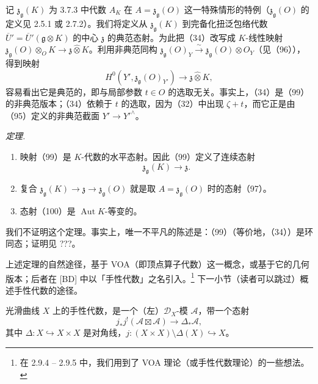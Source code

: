 记 $\mathfrak{z}_{\mathfrak{g}}(K)$ 为 3.7.3 中代数 $A_{K}$ 在 $A = \mathfrak{z}_{\mathfrak{g}}(O)$ 这一特殊情形的特例（$\mathfrak{z}_{\mathfrak{g}}(O)$ 的定义见 2.5.1 或 2.7.2）。我们将定义从 $\mathfrak{z}_{\mathfrak{g}}(K)$ 到完备化扭泛包络代数 $\overline{U}' = \overline{U}'(\mathfrak{g}\otimes K)$ 的中心 $\mathfrak{z}$ 的典范态射。为此把（34）改写成 $K$-线性映射 $\mathfrak{z}_{\mathfrak{g}}(O)\otimes_{O}K \to \mathfrak{z}\widehat{\otimes}K$。利用非典范同构 $\mathfrak{z}_{\mathfrak{g}}(O)_{Y} \xrightarrow{\sim} \mathfrak{z}_{\mathfrak{g}}(O)\otimes O_{Y}$（见（96）），得到映射
\begin{equation}\tag{99}
H^{0}(Y', \mathfrak{z}_{\mathfrak{g}}(O)_{Y'}) \to \mathfrak{z}\widehat{\otimes}K,
\end{equation}
容易看出它是典范的，即与局部参数 $t \in O$ 的选取无关。事实上，（34）是（99）的非典范版本；（34）依赖于 $t$ 的选取，因为（32）中出现 $\zeta + t$，而它正是由（95）定义的非典范截面 $Y' \to Y'^{\wedge}$。

 \emph{定理.}
\begin{enumerate}[label=(\roman*),leftmargin=2.2em]
  \item 映射（99）是 $K$-代数的水平态射。因此（99）定义了连续态射
  \begin{equation}\tag{100}
  \mathfrak{z}_{\mathfrak{g}}(K) \to \mathfrak{z}.
  \end{equation}
  \item 复合 $\mathfrak{z}_{\mathfrak{g}}(K) \to \mathfrak{z} \to \mathfrak{z}_{\mathfrak{g}}(O)$ 就是取 $A = \mathfrak{z}_{\mathfrak{g}}(O)$ 时的态射（97）。
  \item 态射（100）是 $\operatorname{Aut} K$-等变的。
\end{enumerate}


我们不证明这个定理。事实上，唯一不平凡的陈述是：（99）（等价地，（34））是环同态；证明见 ???。

上述定理的自然途径，基于 VOA（即顶点算子代数）这一概念，或基于它的几何版本；后者在 [BD] 中以「手性代数」之名引入。\footnote{在 2.9.4 -- 2.9.5 中，我们用到了 VOA 理论（或手性代数理论）的一些想法。} 下一小节（读者可以跳过）概述手性代数的途径。

 光滑曲线 $X$ 上的手性代数，是一个（左）$\mathcal{D}_X$-模 $\mathcal{A}$，带一个态射
\begin{equation}\tag{101}
j_*j^{!}(\mathcal{A}\boxtimes\mathcal{A})\to\Delta_*\mathcal{A},
\end{equation}
其中 $\Delta:X\hookrightarrow X\times X$ 是对角线，$j:(X\times X)\setminus\Delta(X)\hookrightarrow X$。

